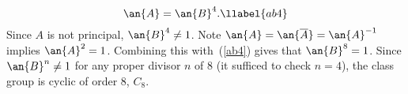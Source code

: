 \begin{ex}
\begin{equation}
\an{A}=\an{B}^4.\llabel{ab4}
\end{equation} Since $A$ is not principal, $\an{B}^4\neq 1$. %
Note $\an{A}=\an{\overline{A}}=\an{A}^{-1}$ implies %
$\an{A}^2=1$. Combining this with~(\ref{ab4}) gives
that $\an{B}^8=1$. Since $\an{B}^n\neq 1$ for any proper divisor $n$ of 8 (it sufficed to check $n=4$), the class group is cyclic of order 8, $C_8$.\\
\end{ex}

